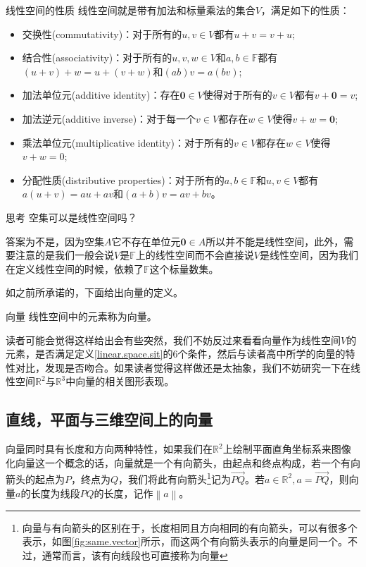\begin{definition}{线性空间的性质}
	\label{linear.space.sit}
	线性空间就是带有加法和标量乘法的集合$V$，满足如下的性质：
	\begin{itemize}
		\item 交换性(commutativity)：对于所有的$u,v\in V$都有$u+v=v+u$;
		\item 结合性(associativity)：对于所有的$u,v,w \in V$和$a,b\in \mathbb{F}$都有$(u+v)+w=u+(v+w)$和$(ab)v=a(bv)$;
		\item 加法单位元(additive identity)：存在$\boldsymbol{0}\in V$使得对于所有的$v\in V$都有$v+\boldsymbol{0}=v$;
		\item 加法逆元(additive inverse)：对于每一个$v\in V$都存在$w\in V$使得$v+w=\boldsymbol{0}$;
		\item 乘法单位元(multiplicative identity)：对于所有的$v\in V$都存在$w\in V$使得$v+w=0$;
		\item 分配性质(distributive properties)：对于所有的$a,b \in \mathbb{F}$和$u,v \in V$都有$a(u+v)=au+av$和$(a+b)v=av+bv$。
	\end{itemize}
\end{definition}

\begin{ascolorbox1}{思考}
	空集可以是线性空间吗？
\end{ascolorbox1}

答案为不是，因为空集$A$它不存在单位元$\boldsymbol{0}\in A$所以并不能是线性空间，此外，需要注意的是我们一般会说$V$是$\mathbb{F}$上的线性空间而不会直接说$V$是线性空间，因为我们在定义线性空间的时候，依赖了$\mathbb{F}$这个标量数集。

如之前所承诺的，下面给出向量的定义。

\begin{definition}{向量}
	线性空间中的元素称为向量。
\end{definition}

读者可能会觉得这样给出会有些突然，我们不妨反过来看看向量作为线性空间$V$的元素，是否满足定义\ref{linear.space.sit}的6个条件，然后与读者高中所学的向量的特性对比，发现是否吻合。如果读者觉得这样做还是太抽象，我们不妨研究一下在线性空间$\mathbb{R}^2$与$\mathbb{R}^3$中向量的相关图形表现。

\subsection{直线，平面与三维空间上的向量}

向量同时具有长度和方向两种特性，如果我们在$\mathbb{R}^2$上绘制平面直角坐标系来图像化向量这一个概念的话，向量就是一个有向箭头，由起点和终点构成，若一个有向箭头的起点为$P$，终点为$Q$，我们将此有向箭头\footnote{向量与有向箭头的区别在于，长度相同且方向相同的有向箭头，可以有很多个表示，如图\ref{fig:same.vector}所示，而这两个有向箭头表示的向量是同一个。不过，通常而言，该有向线段也可直接称为向量}记为$\overrightarrow{PQ}$。若$a\in \mathbb{R}^2,a=\overrightarrow{PQ}$，则向量$a$的长度为线段$PQ$的长度，记作$\left \| a \right \| $。


